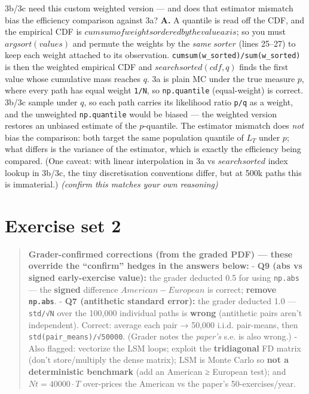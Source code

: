\documentclass[
  11pt,
]{article}
\begin{document}
\begin{enumerate}
  3b/3c need this custom weighted version --- and does that estimator
  mismatch bias the efficiency comparison against 3a? \textbf{A.} A
  quantile is read off the CDF, and the empirical CDF is
  \(cumsum of weights ordered by the value axis\); so you must
  \(argsort(values)\) and permute the weights by the \emph{same}
  \(sorter\) (lines 25--27) to keep each weight attached to its
  observation. \texttt{cumsum(w\_sorted)/sum(w\_sorted)} is then the
  weighted empirical CDF and \(searchsorted(cdf, q)\) finds the first
  value whose cumulative mass reaches \(q\). 3a is plain MC under the
  true measure \(p\), where every path has equal weight \texttt{1/N}, so
  \texttt{np.quantile} (equal-weight) is correct. 3b/3c sample under
  \(q\), so each path carries its likelihood ratio \texttt{p/q} as a
  weight, and the unweighted \texttt{np.quantile} would be biased ---
  the weighted version restores an unbiased estimate of the
  \(p\)-quantile. The estimator mismatch does \emph{not} bias the
  comparison: both target the same population quantile of \(L_T\) under
  \(p\); what differs is the variance of the estimator, which is exactly
  the efficiency being compared. (One caveat: with linear interpolation
  in 3a vs \(searchsorted\) index lookup in 3b/3c, the tiny
  discretisation conventions differ, but at 500k paths this is
  immaterial.) \emph{(confirm this matches your own reasoning)}
\end{enumerate}

\hypertarget{exercise-set-2}{%
\section{Exercise set 2}\label{exercise-set-2}}

\begin{quote}
\textbf{Grader-confirmed corrections (from the graded PDF) --- these
override the ``confirm'' hedges in the answers below:} - \textbf{Q9 (abs
vs signed early-exercise value):} the grader deducted 0.5 for using
\texttt{np.abs} --- the \textbf{signed} difference
\(American − European\) is correct; \textbf{remove \texttt{np.abs}}. -
\textbf{Q7 (antithetic standard error):} the grader deducted 1.0 ---
\texttt{std/√N} over the 100,000 individual paths is \textbf{wrong}
(antithetic pairs aren't independent). Correct: average each pair →
50,000 i.i.d. pair-means, then \texttt{std(pair\_means)/√50000}. (Grader
notes the \emph{paper's} s.e. is also wrong.) - Also flagged: vectorize
the LSM loops; exploit the \textbf{tridiagonal} FD matrix (don't
store/multiply the dense matrix); LSM is Monte Carlo so \textbf{not a
deterministic benchmark} (add an American ≥ European test); and
\(Nt = 40000·T\) over-prices the American vs the paper's
50-exercises/year.
\end{quote}
\end{document}
